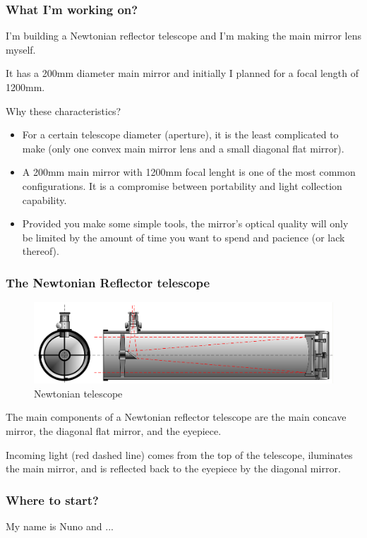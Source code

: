 \documentclass{beamer}
\begin{document}
\begin{frame}
\frametitle{What I'm working on?}
I'm building a Newtonian reflector telescope and I'm making the main mirror lens myself.

It has a 200mm diameter main mirror and initially I planned for a focal length of 1200mm.

Why these characteristics?
\begin{itemize}
\item For a certain telescope diameter (aperture), it is the least complicated to make (only one convex main mirror lens and a small diagonal flat mirror).
\item A 200mm main mirror with 1200mm focal lenght is one of the most common configurations. It is a compromise between portability and light collection capability.
\item Provided you make some simple tools, the mirror's optical quality will only be limited by the amount of time you want to spend and pacience (or lack thereof).
\end{itemize}
\end{frame}

\begin{frame}
\frametitle{The Newtonian Reflector telescope}
\begin{figure}
\includegraphics[scale=0.4]{assets/Newtontelescope.png}
\caption{Newtonian telescope}
\end{figure}
The main components of a Newtonian reflector telescope are the main concave mirror\footnotemark,
the diagonal flat mirror, and the eyepiece\footnotemark.

Incoming light (red dashed line) comes from the top of the telescope, iluminates the main mirror, and is reflected back to the eyepiece by the diagonal mirror.
\end{frame}

\begin{frame}
\frametitle{Where to start?}
My name is Nuno and ...
\end{frame}
\end{document}

